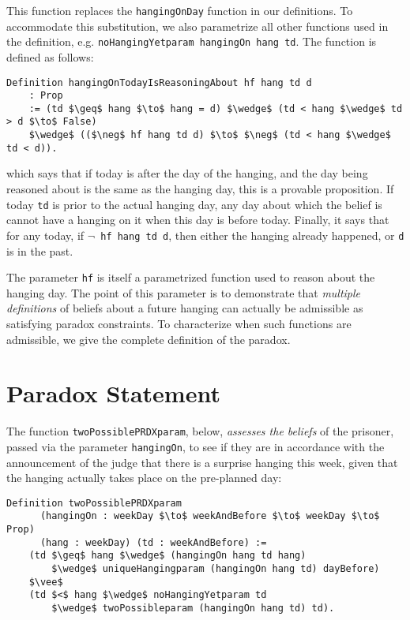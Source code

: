 \documentclass[runningheads]{llncs}
\begin{document}
This function replaces the
{\tt hangingOnDay} function in our definitions.
To accommodate this substitution, we also parametrize all
other functions used in the definition, e.g. {\tt noHangingYetparam hangingOn hang td}.
The function is defined as follows:

\begin{lstlisting}[mathescape=true]
  Definition hangingOnTodayIsReasoningAbout hf hang td d
    : Prop
    := (td $\geq$ hang $\to$ hang = d) $\wedge$ (td < hang $\wedge$ td > d $\to$ False)
    $\wedge$ (($\neg$ hf hang td d) $\to$ $\neg$ (td < hang $\wedge$ td < d)).
\end{lstlisting}

which says that if today is after the day of the hanging, and the
day being reasoned about is the same as the hanging day, this is a provable
proposition. If today {\tt td} is prior
to the actual hanging day, any day about which the belief is
cannot have a hanging on it when this day is before today. Finally,
it says that for any today, if {\tt $\neg$ hf hang td d}, then
either the hanging already happened, or {\tt d} is in the past.

The parameter {\tt hf} is itself a parametrized function used to reason
about the hanging day. The point of
this parameter is to demonstrate that \emph{multiple definitions} of beliefs about
a future hanging can actually be admissible as satisfying paradox constraints.
To characterize when such functions are admissible, we give the complete definition
of the paradox.

\section{Paradox Statement}
\label{sec:constraints}

The function {\tt twoPossiblePRDXparam}, below, \emph{assesses the beliefs}
of the prisoner, passed via the parameter {\tt hangingOn}, to see if they are in
accordance with the announcement of the
judge that there is a surprise hanging this week, given that the hanging actually
takes place on the pre-planned day:

\begin{lstlisting}[mathescape=true]
  Definition twoPossiblePRDXparam
      (hangingOn : weekDay $\to$ weekAndBefore $\to$ weekDay $\to$ Prop)
      (hang : weekDay) (td : weekAndBefore) :=
    (td $\geq$ hang $\wedge$ (hangingOn hang td hang)
        $\wedge$ uniqueHangingparam (hangingOn hang td) dayBefore)
    $\vee$
    (td $<$ hang $\wedge$ noHangingYetparam td
        $\wedge$ twoPossibleparam (hangingOn hang td) td).
\end{lstlisting}
\end{document}
